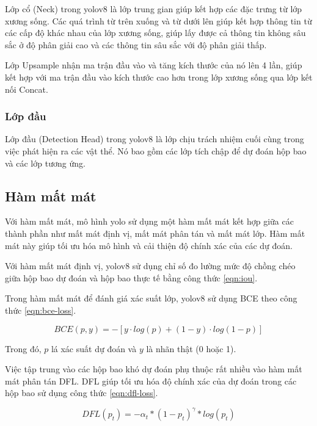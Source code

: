Lớp cổ (Neck) trong \acrshort{yolo}v8 là lớp trung gian giúp kết hợp các đặc trưng từ lớp xương sống. Các quá trình từ trên xuống và từ dưới lên giúp kết hợp thông tin từ các cấp độ khác nhau của lớp xương sống, giúp lấy được cả thông tin không sâu sắc ở độ phân giải cao và các thông tin sâu sắc với độ phân giải thấp.

Lớp Upsample nhận ma trận đầu vào và tăng kích thước của nó lên 4 lần, giúp kết hợp với ma trận đầu vào kích thước cao hơn trong lớp xương sống qua lớp kết nối Concat.

\subsubsection{Lớp đầu}

Lớp đầu (Detection Head) trong \acrshort{yolo}v8 là lớp chịu trách nhiệm cuối cùng trong việc phát hiện ra các vật thể. Nó bao gồm các lớp tích chập để dự đoán hộp bao và các lớp tương ứng.

\subsection{Hàm mất mát}

Với hàm mất mát, mô hình \acrshort{yolo} sử dụng một hàm mất mát kết hợp giữa các thành phần như mất mát định vị, mất mát phân tán và mất mát lớp. Hàm mất mát này giúp tối ưu hóa mô hình và cải thiện độ chính xác của các dự đoán.

Với hàm mất mát định vị, \acrshort{yolo}v8 sử dụng chỉ số đo lường mức độ chồng chéo giữa hộp bao dự đoán và hộp bao thực tế bằng công thức \ref{eqn:iou}.

Trong hàm mất mát để đánh giá xác suất lớp, \acrshort{yolo}v8 sử dụng BCE theo công thức \ref{eqn:bce-loss}.

\begin{equation}
	\label{eqn:bce-loss}
	BCE(p,y)=−[y⋅log(p)+(1−y)⋅log(1−p)]
\end{equation}

Trong đó, $p$ lá xác suất dự đoán và $y$ là nhãn thật (0 hoặc 1).

Việc tập trung vào các hộp bao khó dự đoán phụ thuộc rất nhiều vào hàm mất mát phân tán DFL. DFL giúp tối ưu hóa độ chính xác của dự đoán trong các hộp bao sử dụng công thức \ref{eqn:dfl-loss}.

\begin{equation}
	\label{eqn:dfl-loss}
	DFL(p_t)=-\alpha_t*(1-p_t)^\gamma * log(p_t)
\end{equation}


